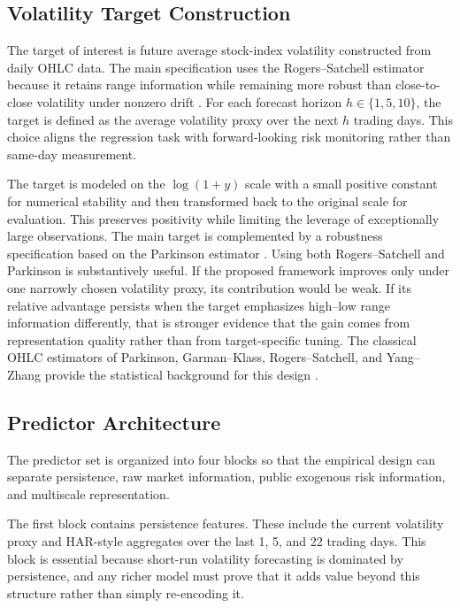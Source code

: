 \subsection{Volatility Target Construction}

The target of interest is future average stock-index volatility constructed from daily OHLC data. The main specification uses the Rogers--Satchell estimator because it retains range information while remaining more robust than close-to-close volatility under nonzero drift \cite{rogers1991estimating}. For each forecast horizon \(h\in\{1,5,10\}\), the target is defined as the average volatility proxy over the next \(h\) trading days. This choice aligns the regression task with forward-looking risk monitoring rather than same-day measurement.

The target is modeled on the \(\log(1+y)\) scale with a small positive constant for numerical stability and then transformed back to the original scale for evaluation. This preserves positivity while limiting the leverage of exceptionally large observations. The main target is complemented by a robustness specification based on the Parkinson estimator \cite{parkinson1980extreme}. Using both Rogers--Satchell and Parkinson is substantively useful. If the proposed framework improves only under one narrowly chosen volatility proxy, its contribution would be weak. If its relative advantage persists when the target emphasizes high--low range information differently, that is stronger evidence that the gain comes from representation quality rather than from target-specific tuning. The classical OHLC estimators of Parkinson, Garman--Klass, Rogers--Satchell, and Yang--Zhang provide the statistical background for this design \cite{parkinson1980extreme,garman1980estimation,rogers1991estimating,yang2000drift,andersen2003rvol}.

\subsection{Predictor Architecture}

The predictor set is organized into four blocks so that the empirical design can separate persistence, raw market information, public exogenous risk information, and multiscale representation.

The first block contains persistence features. These include the current volatility proxy and HAR-style aggregates over the last 1, 5, and 22 trading days. This block is essential because short-run volatility forecasting is dominated by persistence, and any richer model must prove that it adds value beyond this structure rather than simply re-encoding it.


